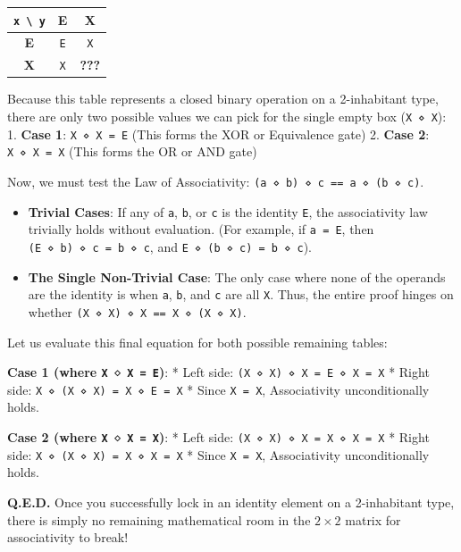 \documentclass[
]{article}
\providecommand{\tightlist}{%
  \setlength{\itemsep}{0pt}\setlength{\parskip}{0pt}}
\begin{document}
\begin{longtable}[]{@{}ccc@{}}
\toprule\noalign{}
\texttt{x\ \textbackslash{}\ y} & E & X \\
\midrule\noalign{}
\endhead
\bottomrule\noalign{}
\endlastfoot
\textbf{E} & \texttt{E} & \texttt{X} \\
\textbf{X} & \texttt{X} & \textbf{???} \\
\end{longtable}

Because this table represents a closed binary operation on a
2-inhabitant type, there are only two possible values we can pick for
the single empty box (\texttt{X\ ⋄\ X}): 1. \textbf{Case 1}:
\texttt{X\ ⋄\ X\ =\ E} (This forms the XOR or Equivalence gate) 2.
\textbf{Case 2}: \texttt{X\ ⋄\ X\ =\ X} (This forms the OR or AND gate)

Now, we must test the Law of Associativity:
\texttt{(a\ ⋄\ b)\ ⋄\ c\ ==\ a\ ⋄\ (b\ ⋄\ c)}.

\begin{itemize}
\tightlist
\item
  \textbf{Trivial Cases}: If any of \texttt{a}, \texttt{b}, or
  \texttt{c} is the identity \texttt{E}, the associativity law trivially
  holds without evaluation. (For example, if \texttt{a\ =\ E}, then
  \texttt{(E\ ⋄\ b)\ ⋄\ c\ =\ b\ ⋄\ c}, and
  \texttt{E\ ⋄\ (b\ ⋄\ c)\ =\ b\ ⋄\ c}).
\item
  \textbf{The Single Non-Trivial Case}: The only case where none of the
  operands are the identity is when \texttt{a}, \texttt{b}, and
  \texttt{c} are all \texttt{X}. Thus, the entire proof hinges on
  whether \texttt{(X\ ⋄\ X)\ ⋄\ X\ ==\ X\ ⋄\ (X\ ⋄\ X)}.
\end{itemize}

Let us evaluate this final equation for both possible remaining tables:

\textbf{Case 1 (where \texttt{X\ ⋄\ X\ =\ E})}: * Left side:
\texttt{(X\ ⋄\ X)\ ⋄\ X\ =\ E\ ⋄\ X\ =\ X} * Right side:
\texttt{X\ ⋄\ (X\ ⋄\ X)\ =\ X\ ⋄\ E\ =\ X} * Since \texttt{X\ =\ X},
Associativity unconditionally holds.

\textbf{Case 2 (where \texttt{X\ ⋄\ X\ =\ X})}: * Left side:
\texttt{(X\ ⋄\ X)\ ⋄\ X\ =\ X\ ⋄\ X\ =\ X} * Right side:
\texttt{X\ ⋄\ (X\ ⋄\ X)\ =\ X\ ⋄\ X\ =\ X} * Since \texttt{X\ =\ X},
Associativity unconditionally holds.

\textbf{Q.E.D.} Once you successfully lock in an identity element on a
2-inhabitant type, there is simply no remaining mathematical room in the
\(2 \times 2\) matrix for associativity to break!
\end{document}
